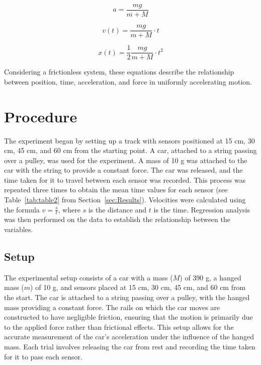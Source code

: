 \documentclass[twocolumn]{article}
\begin{document}
\begin{equation}
a=\frac{mg}{m+M }
\label{eq:a}
\end{equation}

\begin{equation}
v(t)=\frac{mg}{m+M}\cdot t
\label{eq:v_t_mass}
\end{equation}

\begin{equation}
x(t)=\frac{1}{2}\frac{mg}{m+M}\cdot t^{2}
\end{equation}

Considering a frictionless system, these equations describe the relationship between position, time, acceleration, and force in uniformly accelerating motion.

\section{Procedure}

The experiment began by setting up a track with sensors positioned at 15 cm, 30 cm, 45 cm, and 60 cm from the starting point. A car, attached to a string passing over a pulley, was used for the experiment. A mass of 10 g was attached to the car with the string to provide a constant force. The car was released, and the time taken for it to travel between each sensor was recorded. This process was repeated three times to obtain the mean time values for each sensor (see Table~\ref{tab:table2} from Section~\ref{sec:Results}). Velocities were calculated using the formula \(v = \frac{s}{t}\), where \(s\) is the distance and \(t\) is the time. Regression analysis was then performed on the data to establish the relationship between the variables.

\subsection{Setup}

The experimental setup consists of a car with a mass ($M$) of 390 g, a hanged mass ($m$) of 10 g, and sensors placed at 15 cm, 30 cm, 45 cm, and 60 cm from the start. The car is attached to a string passing over a pulley, with the hanged mass providing a constant force. The rails on which the car moves are constructed to have negligible friction, ensuring that the motion is primarily due to the applied force rather than frictional effects. This setup allows for the accurate measurement of the car's acceleration under the influence of the hanged mass. Each trial involves releasing the car from rest and recording the time taken for it to pass each sensor. 
\end{document}

